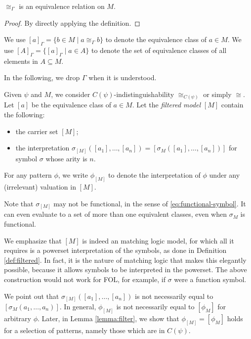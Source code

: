 \begin{lemma}\(\cong_\Gamma\) is an equivalence relation on \(M\).\end{lemma}

\begin{proof}By directly applying the definition.\end{proof}

\begin{definition}We use \([a]_\Gamma = \{b \in M \mid a \cong_\Gamma b\}\) to denote the
equivalence class of \(a \in M\).
We use \([A]_\Gamma = \{ [a]_\Gamma \mid a \in A \}\) to denote the set of
equivalence classes of all elements in \(A \subseteq M\).\end{definition}

In the following, we drop \(\Gamma\) when it is understood.

\begin{definition}\label{def:filtered}
Given $\psi$ and $M$, 
we consider $C(\psi)$-indistinguishability $\cong_{C(\psi)}$ or simply $\cong$.
Let $[a]$ be the equivalence class of 
$a \in M$.
Let the \emph{filtered model}
$[M]$ contain the following:
\begin{itemize}
\item the carrier set $[M]$;
\item the interpretation $\sigma_{[M]}\left([a_1],\dots,[a_n]\right) = 
[\sigma_M([a_1],\dots,[a_n])]$ for symbol $\sigma$ whose arity is $n$.
\end{itemize}
For any pattern $\phi$, we write $\phi_{[M]}$ to denote the 
interpretation of $\phi$ under any (irrelevant) valuation in $[M]$.  
\end{definition}

\begin{remark}
Note that $\sigma_{[M]}$ may not be functional, in the sense 
of \eqref{eq:functional-symbol}.
It can even evaluate to a set of more than one equivalent classes, 
even when $\sigma_M$ is functional.
\end{remark}

We emphasize that \([M]\) is indeed an matching logic model,
for which all it requires is a powerset interpretation of the symbols,
as done in Definition \ref{def:filtered}.
In fact, it is the nature of matching logic that makes this elegantly possible, because it
allows symbols to be interpreted in the powerset.
The above construction would not work for FOL, for example,
if \(\sigma\) were a function symbol.

We point out that \(\sigma_{[M]}([a_1],\dots,[a_n])\) is not necessarily
equal to \([\sigma_M(a_1,\dots,a_n)]\).
In general, \(\phi_{[M]}\)
is not necessarily equal to \([\phi_M]\) for arbitrary \(\phi\).
Later, in Lemma \ref{lemma:filter}, we show that \(\phi_{[M]} = [\phi_M]\)
holds for a selection of patterns, namely those which are in \(C(\psi)\).

